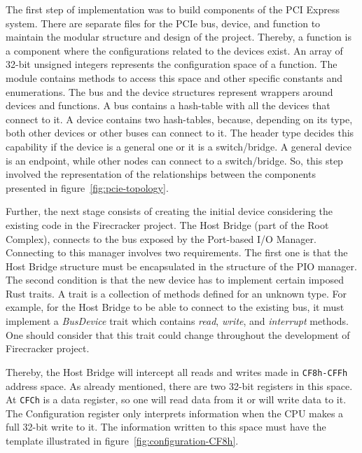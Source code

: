 \documentclass[12pt, a4paper]{report}
\begin{document}
The first step of implementation was to build components of the PCI Express system. There are separate files for the PCIe bus, device, and function to maintain the modular structure and design of the project. Thereby, a function is a component where the configurations related to the devices exist. An array of 32-bit unsigned integers represents the configuration space of a function. The module contains methods to access this space and other specific constants and enumerations. The bus and the device structures represent wrappers around devices and functions. A bus contains a hash-table with all the devices that connect to it. A device contains two hash-tables, because, depending on its type, both other devices or other buses can connect to it. The header type decides this capability if the device is a general one or it is a switch/bridge. A general device is an endpoint, while other nodes can connect to a switch/bridge. So, this step involved the representation of the relationships between the components presented in figure~\ref{fig:pcie-topology}.

Further, the next stage consists of creating the initial device considering the existing code in the Firecracker project. The Host Bridge (part of the Root Complex), connects to the bus exposed by the Port-based I/O Manager. Connecting to this manager involves two requirements. The first one is that the Host Bridge structure must be encapsulated in the structure of the PIO manager. The second condition is that the new device has to implement certain imposed Rust traits. A trait is a collection of methods defined for an unknown type. For example, for the Host Bridge to be able to connect to the existing bus, it must implement a \textit{BusDevice} trait which contains \textit{read}, \textit{write}, and \textit{interrupt} methods. One should consider that this trait could change throughout the development of Firecracker project.

Thereby, the Host Bridge will intercept all reads and writes made in \texttt{CF8h-CFFh} address space. As already mentioned, there are two 32-bit registers in this space. At \texttt{CFCh} is a data register, so one will read data from it or will write data to it. The Configuration register only interprets information when the CPU makes a full 32-bit write to it. The information written to this space must have the template illustrated in figure~\ref{fig:configuration-CF8h}.
\end{document}
